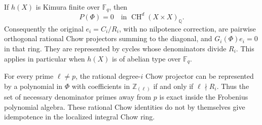 \begin{proposition}
If $h(X)$ is Kimura finite over $\mathbb F_q$, then
\[
                     P(\Phi)=0
       \quad\text{in }\operatorname{CH}^d(X\times X)_{\mathbb Q}.
\tag{AG-chow-cayley}
\]
Consequently the original $e_i=C_i/R_i$, with no
nilpotence correction, are pairwise orthogonal
rational Chow projectors summing to the diagonal,
and $G_i(\Phi)e_i=0$ in that ring.  They are
represented by cycles whose denominators divide
$R_i$.  This applies in particular when $h(X)$ is
of abelian type over $\mathbb F_q$.

For every prime $\ell\ne p$, the rational degree-$i$ Chow
projector can be represented by a polynomial in
$\Phi$ with coefficients in $\mathbb Z_{(\ell)}$
if and only if $\ell\nmid R_i$.  Thus the set of
necessary denominator primes away from $p$ is exact
inside the Frobenius polynomial algebra.  These
rational Chow identities do not by themselves give
idempotence in the localized integral Chow ring.
\end{proposition}
